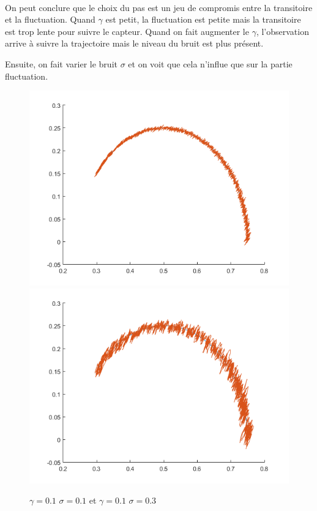\documentclass{article}
\begin{document}
\\On peut conclure que le choix du pas est un jeu de compromis entre la transitoire et la fluctuation. Quand $\gamma$ est petit, la fluctuation est petite mais la transitoire est trop lente pour suivre le capteur. Quand on fait augmenter le $\gamma$, l'observation arrive \`a suivre la trajectoire mais le niveau du bruit est plus pr\'esent.

Ensuite, on fait varier le bruit $\sigma$ et on voit que cela n'influe que sur la partie fluctuation.
\begin{figure}[h]
\includegraphics[scale=0.4]{LMS_sigma001.png} \includegraphics[scale=0.4]{LMS_gamma01.png} 
\caption{$\gamma=0.1$ $\sigma=0.1$ et $\gamma=0.1$ $\sigma=0.3$}
\end{figure} 
\end{document}
